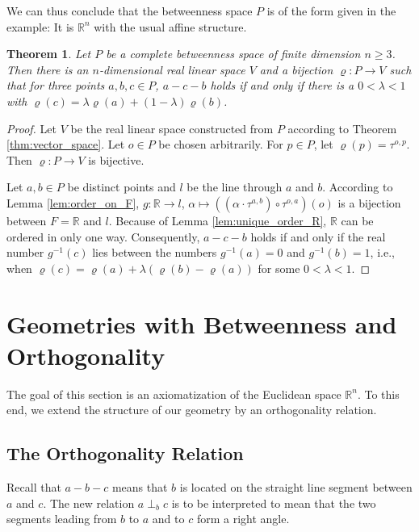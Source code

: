 \documentclass[11pt,a4paper]{article}
\newcommand{\betw}[3]{#1 - #2 - #3}
\newcommand{\ortho}[3]{#1 \perp_{#2} #3}
\newtheorem{theorem}{Theorem}[section]
\begin{document}
We can thus conclude that the betweenness space $P$ is of the form given in the example: It is $\mathbb{R}^n$ with the usual affine structure.

\begin{theorem} \label{thm:affine_coord}
Let $P$ be a complete betweenness space of finite dimension $n \ge 3$. Then there is an $n$-dimensional real linear space $V$ and a bijection $\varrho: P \to V$ such that for three points $a, b, c \in P$, $\betw{a}{c}{b}$ holds if and only if there is a $0 < \lambda < 1$ with $\varrho(c) = \lambda \varrho(a) + (1 - \lambda)\varrho(b)$.
\end{theorem}

\begin{proof}
Let $V$ be the real linear space constructed from $P$ according to Theorem \ref{thm:vector_space}. Let $o \in P$ be chosen arbitrarily. For $p \in P$, let $\varrho(p) = \tau^{o,p}$. Then $\varrho: P \to V$ is bijective.

Let $a, b \in P$ be distinct points and $l$ be the line through $a$ and $b$. According to Lemma \ref{lem:order_on_F}, $g: \mathbb{R} \to l$, $\alpha \mapsto ((\alpha \cdot \tau^{a,b}) \circ \tau^{o,a})(o)$ is a bijection between $F = \mathbb{R}$ and $l$. Because of Lemma \ref{lem:unique_order_R}, $\mathbb{R}$ can be ordered in only one way. Consequently, $\betw{a}{c}{b}$ holds if and only if the real number $g^{-1}(c)$ lies between the numbers $g^{-1}(a) = 0$ and $g^{-1}(b) = 1$, i.e., when $\varrho(c) = \varrho(a) + \lambda(\varrho(b) - \varrho(a))$ for some $0 < \lambda < 1$.
\end{proof}

\section{Geometries with Betweenness and Orthogonality}

The goal of this section is an axiomatization of the Euclidean space $\mathbb{R}^n$. To this end, we extend the structure of our geometry by an orthogonality relation.

\subsection{The Orthogonality Relation}

Recall that $\betw{a}{b}{c}$ means that $b$ is located on the straight line segment between $a$ and $c$. The new relation $\ortho{a}{b}{c}$ is to be interpreted to mean that the two segments leading from $b$ to $a$ and to $c$ form a right angle.
\end{document}
